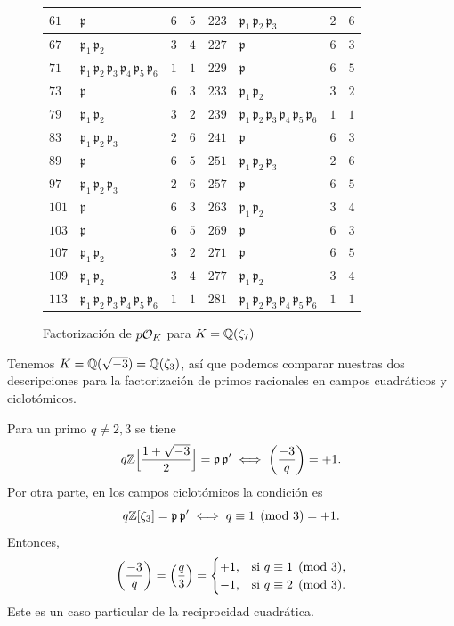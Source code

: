 \begin{figure}
\begin{center}
\begin{tabular}{x{1cm}x{2.5cm}x{1cm}x{1.25cm}x{1cm}x{2.5cm}x{1cm}x{1.25cm}}
\hline
$61$ & $\mathfrak{p}$ & $6$ & $5$ & $223$ & $\mathfrak{p}_1\,\mathfrak{p}_2\,\mathfrak{p}_3$ & $2$ & $6$ \tabularnewline
\hline
$67$ & $\mathfrak{p}_1\,\mathfrak{p}_2$ & $3$ & $4$ & $227$ & $\mathfrak{p}$ & $6$ & $3$ \tabularnewline
\hline
$71$ & $\mathfrak{p}_1\,\mathfrak{p}_2\,\mathfrak{p}_3\,\mathfrak{p}_4\,\mathfrak{p}_5\,\mathfrak{p}_6$ & $1$ & $1$ & $229$ & $\mathfrak{p}$ & $6$ & $5$ \tabularnewline
\hline
$73$ & $\mathfrak{p}$ & $6$ & $3$ & $233$ & $\mathfrak{p}_1\,\mathfrak{p}_2$ & $3$ & $2$ \tabularnewline
\hline
$79$ & $\mathfrak{p}_1\,\mathfrak{p}_2$ & $3$ & $2$ & $239$ & $\mathfrak{p}_1\,\mathfrak{p}_2\,\mathfrak{p}_3\,\mathfrak{p}_4\,\mathfrak{p}_5\,\mathfrak{p}_6$ & $1$ & $1$ \tabularnewline
\hline
$83$ & $\mathfrak{p}_1\,\mathfrak{p}_2\,\mathfrak{p}_3$ & $2$ & $6$ & $241$ & $\mathfrak{p}$ & $6$ & $3$ \tabularnewline
\hline
$89$ & $\mathfrak{p}$ & $6$ & $5$ & $251$ & $\mathfrak{p}_1\,\mathfrak{p}_2\,\mathfrak{p}_3$ & $2$ & $6$ \tabularnewline
\hline
$97$ & $\mathfrak{p}_1\,\mathfrak{p}_2\,\mathfrak{p}_3$ & $2$ & $6$ & $257$ & $\mathfrak{p}$ & $6$ & $5$ \tabularnewline
\hline
$101$ & $\mathfrak{p}$ & $6$ & $3$ & $263$ & $\mathfrak{p}_1\,\mathfrak{p}_2$ & $3$ & $4$ \tabularnewline
\hline
$103$ & $\mathfrak{p}$ & $6$ & $5$ & $269$ & $\mathfrak{p}$ & $6$ & $3$ \tabularnewline
\hline
$107$ & $\mathfrak{p}_1\,\mathfrak{p}_2$ & $3$ & $2$ & $271$ & $\mathfrak{p}$ & $6$ & $5$ \tabularnewline
\hline
$109$ & $\mathfrak{p}_1\,\mathfrak{p}_2$ & $3$ & $4$ & $277$ & $\mathfrak{p}_1\,\mathfrak{p}_2$ & $3$ & $4$ \tabularnewline
\hline
$113$ & $\mathfrak{p}_1\,\mathfrak{p}_2\,\mathfrak{p}_3\,\mathfrak{p}_4\,\mathfrak{p}_5\,\mathfrak{p}_6$ & $1$ & $1$ & $281$ & $\mathfrak{p}_1\,\mathfrak{p}_2\,\mathfrak{p}_3\,\mathfrak{p}_4\,\mathfrak{p}_5\,\mathfrak{p}_6$ & $1$ & $1$ \tabularnewline
\hline
\end{tabular}
\end{center}

\caption{Factorización de $p\mathcal{O}_K$ para $K = \mathbb{Q} (\zeta_7)$}
\end{figure}

\begin{ejemplo}
  Tenemos $K = \mathbb{Q} (\sqrt{-3}) = \mathbb{Q} (\zeta_3)$, así que podemos comparar
  nuestras dos descripciones para la factorización de primos racionales en
  campos cuadráticos y ciclotómicos.

  Para un primo $q \ne 2,3$ se tiene
  \[ q \mathbb{Z} \Bigl[\frac{1+\sqrt{-3}}{2}\Bigr] = \mathfrak{p}\,\mathfrak{p}'
     \iff \left(\frac{-3}{q}\right) = +1. \]
  Por otra parte, en los campos ciclotómicos la condición es
  $$q \mathbb{Z} [\zeta_3] = \mathfrak{p}\,\mathfrak{p}' \iff q \equiv 1 \pmod{3} = +1.$$
  Entonces,
  \[ \left(\frac{-3}{q}\right) = \left(\frac{q}{3}\right) = \begin{cases}
    +1, & \text{si }q\equiv 1 \pmod{3},\\
    -1, & \text{si }q\equiv 2 \pmod{3}.
  \end{cases} \]
  Este es un caso particular de la reciprocidad cuadrática.
\end{ejemplo}

